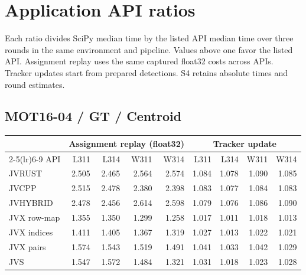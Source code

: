 \section*{Application API ratios}
Each ratio divides SciPy median time by the listed API median time over three rounds in the same environment and pipeline. Values above one favor the listed API. Assignment replay uses the same captured float32 costs across APIs. Tracker updates start from prepared detections. S4 retains absolute times and round estimates.
\subsection*{MOT16-04 / GT / Centroid}
\begin{center}\small
\begin{tabular}{@{}lrrrrrrrr@{}}
\toprule
 & \multicolumn{4}{c}{Assignment replay (float32)} & \multicolumn{4}{c}{Tracker update} \\
\cmidrule(lr){2-5}\cmidrule(lr){6-9}
API & L311 & L314 & W311 & W314 & L311 & L314 & W311 & W314 \\
\midrule
JVRUST & 2.505 & 2.465 & 2.564 & 2.574 & 1.084 & 1.078 & 1.090 & 1.085 \\
JVCPP & 2.515 & 2.478 & 2.380 & 2.398 & 1.083 & 1.077 & 1.084 & 1.083 \\
JVHYBRID & 2.478 & 2.456 & 2.614 & 2.598 & 1.079 & 1.076 & 1.086 & 1.090 \\
JVX row-map & 1.355 & 1.350 & 1.299 & 1.258 & 1.017 & 1.011 & 1.018 & 1.013 \\
JVX indices & 1.411 & 1.405 & 1.367 & 1.319 & 1.027 & 1.013 & 1.022 & 1.021 \\
JVX pairs & 1.574 & 1.543 & 1.519 & 1.491 & 1.041 & 1.033 & 1.042 & 1.029 \\
JVS & 1.547 & 1.572 & 1.484 & 1.321 & 1.031 & 1.018 & 1.023 & 1.028 \\
\bottomrule
\end{tabular}
\end{center}

